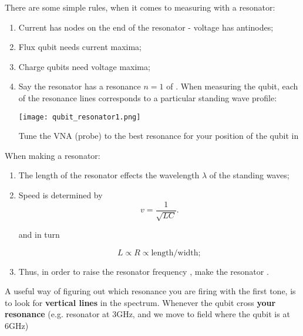 There  are  some  simple  rules,  when it  comes  to  measuring  with  a
resonator:

\begin{framed}\noindent
  \begin{enumerate}
  \item Current  has nodes  on the  end of the  resonator -  voltage has
    antinodes;
  \item Flux qubit needs current maxima;
  \item Charge qubits need voltage maxima;
  \item Say the resonator  has a resonance $ n =  1 $ of .
    When measuring the qubit, each of the resonance lines corresponds to
    a particular standing wave profile:
    \begin{center}
      \texttt{[image: qubit\_resonator1.png]}
    \end{center}
    \noindent  Tune the  VNA  (probe)  to the  best  resonance for  your
    position of the qubit in 
  \end{enumerate}
\end{framed}

\begin{framed}\noindent
  When making a resonator:
  \begin{enumerate}
  \item The length of the  resonator effects the wavelength $\lambda$ of
    the standing waves;

  \item Speed is determined by
    \begin{equation}
      \label{eq:resonator2}
      v = \frac{1}{\sqrt{LC}}.
    \end{equation}

    \noindent and in turn

    \begin{equation}
      \label{eq:resonator3}
      L      \propto  R \propto  \text{length}/\text{width};
    \end{equation}

  \item   Thus,   in   order    to   raise   the   resonator   frequency
    , make the resonator .
  \end{enumerate}
\end{framed}

\noindent A  useful way of figuring  out which resonance you  are firing
with  the first  tone, is  to look  for \textbf{vertical  lines} in  the
spectrum.   Whenever  the  qubit  cross  \textbf{your  resonance}  (e.g.
resonator at  3GHz, and  we move to  field where the  qubit is  at 6GHz)

